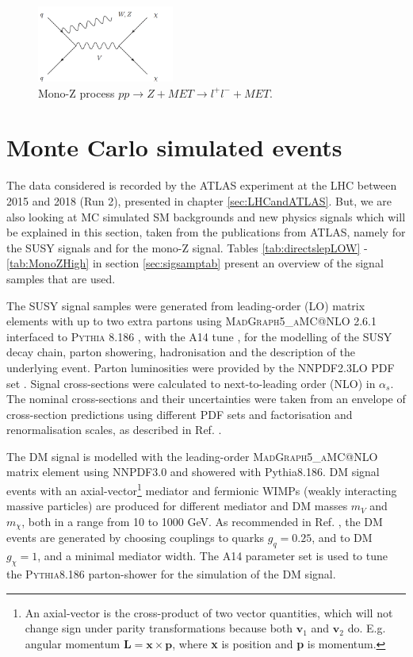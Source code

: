 \begin{figure}[H]
    \centering
    \includegraphics[width = 0.4\textwidth]{Figures/FeynmanDiagrams/monoZFeynman2.png}
    \caption{Mono-Z process $pp \rightarrow Z + MET \rightarrow l^+ l^- + MET$.}
    \label{fig:monoZFeynman2}
\end{figure}


\section{Monte Carlo simulated events}

The data considered is recorded by the ATLAS experiment at the LHC between 2015 and 2018 (Run 2), presented in chapter \ref{sec:LHCandATLAS}. But, we are also looking at MC simulated SM backgrounds and new physics signals which will be explained in this section, taken from the publications from ATLAS, namely \cite{sleptonexclusion} for the SUSY signals and \cite{monoZexclusion} for the mono-Z signal. Tables \ref{tab:directslepLOW} - \ref{tab:MonoZHigh} in section \ref{sec:sigsamptab} present an overview of the signal samples that are used. 

The SUSY signal samples were generated from leading-order (LO) matrix elements with up to two extra partons using \textsc{MadGraph5\_aMC@NLO 2.6.1} \cite{48} interfaced to \textsc{Pythia 8.186} \cite{49}, with the A14 tune \cite{50}, for the modelling of the SUSY decay chain, parton showering, hadronisation and the description of the underlying event. Parton luminosities were provided by the NNPDF2.3LO PDF set \cite{51}. Signal cross-sections were calculated to next-to-leading order (NLO) in $\alpha_s$. The nominal cross-sections and their uncertainties were taken from an envelope of cross-section predictions using different PDF sets and factorisation and renormalisation scales, as described in Ref. \cite{60}. 


The DM signal is modelled with the leading-order \textsc{MadGraph5\_aMC@NLO} matrix element \cite{54Z} using NNPDF3.0 \cite{55Z} and showered with Pythia8.186. DM signal events with an axial-vector\footnote{An axial-vector is the cross-product of two vector quantities, which will not change sign under parity transformations because both $\mathbf{v}_1$ and $\mathbf{v}_2$ do. E.g. angular momentum $\mathbf{L} = \mathbf{x} \times \mathbf{p}$, where \textbf{x} is position and \textbf{p} is momentum.} mediator and fermionic WIMPs (weakly interacting massive particles) are produced for different mediator and DM masses $m_{V}$ and $m_\chi$, both in a range from 10 to 1000 GeV.  As recommended in Ref. \cite{44Z}, the DM events are generated by choosing couplings to quarks $g_q = 0.25$, and to DM $g_\chi = 1$, and a minimal mediator width. The A14 \cite{57Z} parameter set is used to tune the \textsc{Pythia8.186} parton-shower for the simulation of the DM signal.


